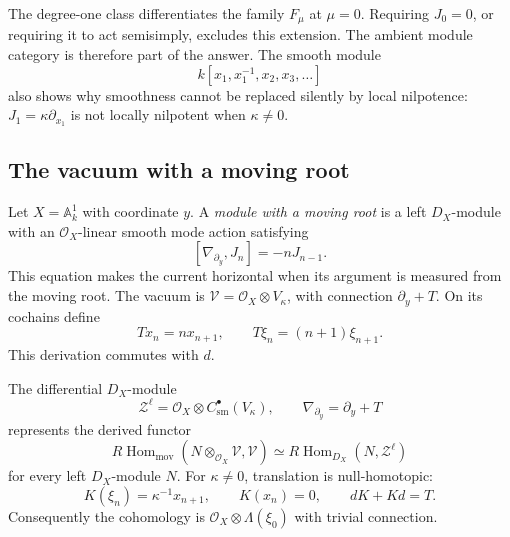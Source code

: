 The degree-one class differentiates the family $F_\mu$ at $\mu=0$.
Requiring $J_0=0$, or requiring it to act semisimply, excludes
this extension. The ambient module category is therefore part of
the answer. The smooth module
\[
 k[x_1,x_1^{-1},x_2,x_3,\ldots]
\]
also shows why smoothness cannot be replaced silently by local
nilpotence: $J_1=\kappa\partial_{x_1}$ is not locally nilpotent
when $\kappa\ne0$.

\subsection{The vacuum with a moving root}

Let $X=\mathbb A^1_k$ with coordinate $y$.
A \emph{module with a moving root} is a left $D_X$-module
with an $\mathcal O_X$-linear smooth mode action satisfying
\[
 [\nabla_{\partial_y},J_n]=-nJ_{n-1}.
\]
This equation makes the current horizontal when its argument is
measured from the moving root. The vacuum is
$\mathcal V=\mathcal O_X\otimes V_\kappa$, with connection
$\partial_y+T$. On its cochains define
\[
 Tx_n=nx_{n+1},\qquad T\xi_n=(n+1)\xi_{n+1}.
\]
This derivation commutes with $d$.

\begin{theorem}
\label{v4-arith:centers:thm:moving-vacuum}
The differential $D_X$-module
\[
 \mathcal Z^\ell
 =\mathcal O_X\otimes C^\bullet_{\mathrm{sm}}(V_\kappa),
 \qquad \nabla_{\partial_y}=\partial_y+T
\]
represents the derived functor
\[
 R\operatorname{Hom}_{\mathrm{mov}}
 (N\otimes_{\mathcal O_X}\mathcal V,\mathcal V)
 \simeq
 R\operatorname{Hom}_{D_X}(N,\mathcal Z^\ell)
\]
for every left $D_X$-module $N$. For $\kappa\ne0$, translation
is null-homotopic:
\[
 K(\xi_n)=\kappa^{-1}x_{n+1},\qquad K(x_n)=0,
 \qquad dK+Kd=T.
\]
Consequently the cohomology is
$\mathcal O_X\otimes\Lambda(\xi_0)$ with trivial connection.
\end{theorem}

